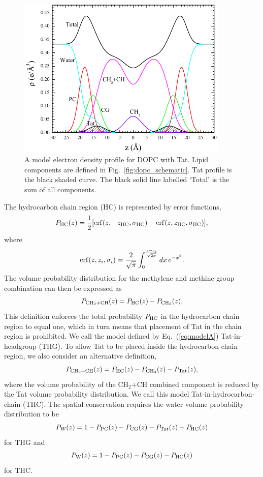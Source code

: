 \begin{figure}[htbp]
  \centering
  \includegraphics[width=0.9\textwidth]{figures/Tat/SDP_Results/EDP/DOPC_Tat_model_EDP}
  \caption[A model electron density profile for DOPC with Tat]
  {A model electron density profile for DOPC with Tat. Lipid components
  are defined in Fig.~\ref{fig:dopc_schematic}. Tat profile is the black shaded
  curve. The black solid line labelled `Total' is the sum of all components.}
  \label{fig:DOPC_EDP}
\end{figure}

The hydrocarbon chain region (HC) is represented by error functions,
\begin{equation}
  P_\textrm{HC}(z) = \frac{1}{2}\mathopen{}\left[ 
    \mathrm{erf}(z,-z_\textrm{HC},\sigma_\textrm{HC}) - \mathrm{erf}(z,z_\textrm{HC},\sigma_\textrm{HC})
   \right]\mathclose{},
\end{equation}
where
\begin{equation}
  \mathrm{erf}(z,z_i,\sigma_i)=\frac{2}{\sqrt{\pi}}
    \int_0^{\frac{z-z_i}{\sqrt{2\sigma}}} \mathop{dx} e^{-x^2}.
\end{equation}
The volume probability distribution for the methylene and methine group
combination can then be expressed as
\begin{equation}
  P_{\textrm{CH}_2+\textrm{CH}}(z) = P_\textrm{HC}(z)-P_{\textrm{CH}_3}(z).
  \label{eq:modelA}
\end{equation}
This definition enforces the total probability $P_\textrm{HC}$ in the hydrocarbon
chain region to equal one, which in turn means that placement of Tat in the  
chain region is prohibited. We call the model defined by Eq.~(\ref{eq:modelA})
Tat-in-headgroup (THG). To allow Tat to be placed inside the hydrocarbon
chain region, we also consider an alternative definition,
\begin{equation}
  P_{\textrm{CH}_2+\textrm{CH}}(z) = P_\textrm{HC}(z)-P_{\textrm{CH}_3}(z) - P_\textrm{Tat}(z),
\end{equation}
where the volume probability of the CH$_2$+CH combined component is reduced by 
the Tat volume probability distribution. We call this model Tat-in-hydrocarbon-chain (THC).
The spatial conservation requires the water volume probability distribution 
to be
\begin{equation}
  P_\textrm{W}(z) = 1-P_\textrm{PC}(z)-P_\textrm{CG}(z)-P_\textrm{Tat}(z)-P_\textrm{HC}(z)
\end{equation}
for THG and
\begin{equation}
  P_\textrm{W}(z) = 1-P_\textrm{PC}(z)-P_\textrm{CG}(z)-P_\textrm{HC}(z)
\end{equation}
for THC. 

